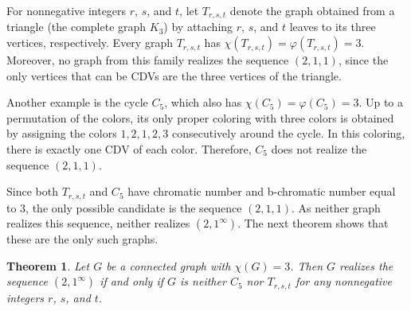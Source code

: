\documentclass{article}
\newtheorem{theorem}{Theorem}[section]
\theoremstyle{definition}
\begin{document}
For nonnegative integers $r$, $s$, and $t$, let $T_{r,s,t}$ denote the graph obtained from a triangle (the complete graph $K_3$) by attaching $r$, $s$, and $t$ leaves to its three vertices, respectively. Every graph $T_{r,s,t}$ has $\chi(T_{r,s,t})=\varphi(T_{r,s,t})=3$. Moreover, no graph from this family realizes the sequence $(2,1,1)$, since the only vertices that can be CDVs are the three vertices of the triangle.

Another example is the cycle $C_5$, which also has $\chi(C_5)=\varphi(C_5)=3$. Up to a permutation of the colors, its only proper coloring with three colors is obtained by assigning the colors $1,2,1,2,3$ consecutively around the cycle. In this coloring, there is exactly one CDV of each color. Therefore, $C_5$ does not realize the sequence $(2,1,1)$.

Since both $T_{r,s,t}$ and $C_5$ have chromatic number and b-chromatic number equal to $3$, the only possible candidate is the sequence $(2,1,1)$. As neither graph realizes this sequence, neither realizes $(2,1^\infty)$. The next theorem shows that these are the only such graphs.

\begin{theorem}\label{t:chi3}
Let $G$ be a connected graph with $\chi(G)=3$. 
Then $G$ realizes the sequence $(2,1^\infty)$ if and only if $G$ is neither $C_5$ nor $T_{r,s,t}$ for any nonnegative integers $r$, $s$, and $t$. 
\end{theorem}
\end{document}
